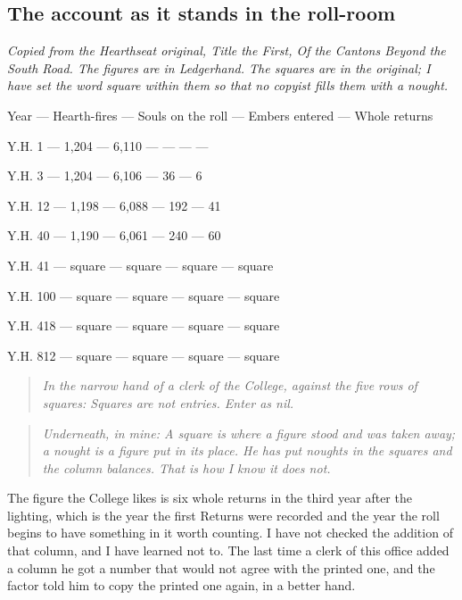\documentclass{design/chronicle}
\begin{document}
\subsection*{The account as it stands in the roll-room}

\emph{Copied from the Hearthseat original, Title the First, Of the Cantons Beyond the South Road. The figures are in Ledgerhand. The squares are in the original; I have set the word square within them so that no copyist fills them with a nought.}

Year — Hearth-fires — Souls on the roll — Embers entered — Whole returns\par

Y.H. 1 — 1,204 — 6,110 — — — —\par

Y.H. 3 — 1,204 — 6,106 — 36 — 6\par

Y.H. 12 — 1,198 — 6,088 — 192 — 41\par

Y.H. 40 — 1,190 — 6,061 — 240 — 60\par

Y.H. 41 — square — square — square — square\par

Y.H. 100 — square — square — square — square\par

Y.H. 418 — square — square — square — square\par

Y.H. 812 — square — square — square — square\par

\begin{quote}\itshape \emph{In the narrow hand of a clerk of the College, against the five rows of squares:} Squares are not entries. Enter as nil.\end{quote}

\begin{quote}\itshape \end{quote}

\begin{quote}\itshape \emph{Underneath, in mine:} A square is where a figure stood and was taken away; a nought is a figure put in its place. He has put noughts in the squares and the column balances. That is how I know it does not.\end{quote}

The figure the College likes is six whole returns in the third year after the lighting, which is the year the first Returns were recorded and the year the roll begins to have something in it worth counting. I have not checked the addition of that column, and I have learned not to. The last time a clerk of this office added a column he got a number that would not agree with the printed one, and the factor told him to copy the printed one again, in a better hand.
\end{document}
